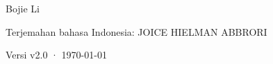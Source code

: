 \begin{titlepage}
\vfill
{\LARGE\sffamily Bojie Li\par}
\vspace{0.35cm}
{\small\sffamily Terjemahan bahasa Indonesia: JOICE HIELMAN ABBRORI\par}
\vspace{0.45cm}
{\small\sffamily\color{structurecolor!80} Versi v2.0 · \today\par}
\vspace{1.2cm}
\end{titlepage}
